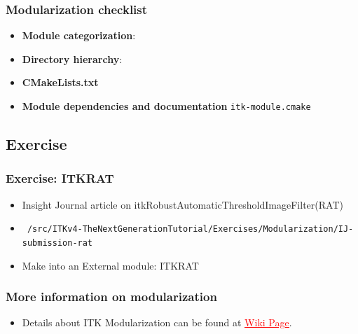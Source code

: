 \begin{frame}[fragile]
\frametitle{Modularization checklist}
\begin{itemize}
\item<1->\textbf{Module categorization}: 
\item<4->\textbf{Directory hierarchy}: 
\item<8->\textbf{CMakeLists.txt} 
\item<12->\textbf{Module dependencies and documentation} \texttt{itk-module.cmake}
\end{itemize}
\end{frame}


\subsection{Exercise}
\begin{frame}
\frametitle{Exercise: ITKRAT}
\small
\begin{itemize}
\item  Insight Journal article on itkRobustAutomaticThresholdImageFilter(RAT)
\item
\texttt{~/src/ITKv4-TheNextGenerationTutorial/Exercises/Modularization/IJ-submission-rat}
\item  Make into an External module: ITKRAT
\end{itemize}
\end{frame}


\begin{frame}
\frametitle{More information on modularization}
\begin{itemize}
\item  Details about ITK Modularization can be found at \href{http://www.itk.org/Wiki/ITK\_Release\_4/Modularization}{\textcolor{red}{\underline{Wiki Page}}}.
\end{itemize}
\end{frame}
